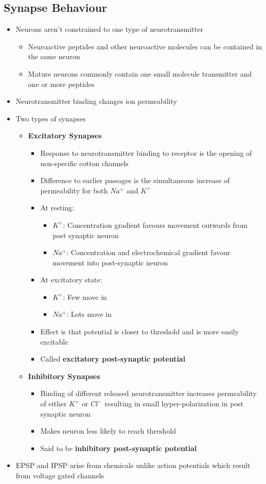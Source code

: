 \documentclass[11pt]{article}
\begin{document}
\subsection{Synapse Behaviour}
\begin{itemize}
\item Neurons aren't constrained to one type of neurotransmitter
\begin{itemize}
\item Neuroactive peptides and other neuroactive molecules can be contained in the same neuron
\item Mature neurons commonly contain one small molecule transmitter and one or more peptides
\end{itemize}
\item Neurotransmitter binding changes ion permeability
\item Two types of synapses
\begin{itemize}
\item \textbf{
Excitatory Synapses}
\begin{itemize}
\item Response to neurotransmitter binding to receptor is the opening of non-specific cotton channels 
\item Difference to earlier passages is the simultaneous increase of permeability for both $Na^+$ and $K^+$ 
\item At resting:
\begin{itemize}
\item $K^+$: Concentration gradient favours movement outwards from post synaptic neuron
\item $Na^+$: Concentration and electrochemical gradient favour movement into post-synaptic neuron
\end{itemize}
\item At excitatory state:
\begin{itemize}
\item $K^+$: Few move in
\item $Na^+$: Lots move in
\end{itemize}
\item Effect is that potential is closer to threshold and is more easily excitable
\item Called \textbf{excitatory post-synaptic potential}
\end{itemize}
\item \textbf{Inhibitory Synapses}
\begin{itemize}
\item Binding of different released neurotransmitter increases permeability of either $K^+$ or  $Cl^-$ resulting in small hyper-polarization in post synaptic neuron
\item Makes neuron less likely to reach threshold 
\item Said to be \textbf{inhibitory post-synaptic potential}
\end{itemize}
\end{itemize}
\item EPSP and IPSP arise from chemicals unlike action potentials which result from voltage gated channels 
\end{itemize}
\end{document}
